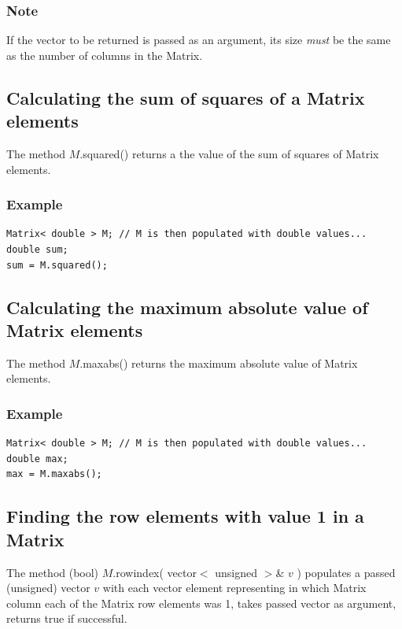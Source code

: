 \documentclass{report}
\begin{document}
\subsubsection{Note}

If the vector to be returned is passed as an argument, its size {\em
must} be the same as the number of columns in the Matrix.

\subsection{Calculating the sum of squares of a Matrix elements}

The method $M$.squared() returns a the value of the sum of squares
of Matrix elements.

\subsubsection{Example}
\begin{verbatim}
Matrix< double > M; // M is then populated with double values...
double sum;
sum = M.squared();
\end{verbatim}

\subsection{Calculating the maximum absolute value of Matrix elements}

The method $M$.maxabs() returns the maximum absolute value of Matrix
elements.

\subsubsection{Example}
\begin{verbatim}
Matrix< double > M; // M is then populated with double values...
double max;
max = M.maxabs();
\end{verbatim}

\subsection{Finding the row elements with value 1 in a Matrix}

The method (bool) $M$.rowindex( vector$<$ unsigned $>$\& $v$ )
populates a passed (unsigned) vector $v$ with each vector element
representing in which Matrix column each of the Matrix row elements
was 1, takes passed vector as argument, returns true if successful.
\end{document}
